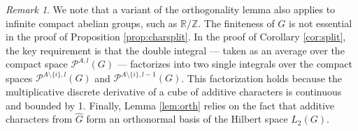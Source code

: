 \documentclass{amsart}
\theoremstyle{definition}
\theoremstyle{remark}
\newtheorem{remark}[theorem]{Remark}
\numberwithin{equation}{section}
\begin{document}
\begin{remark}
We note  that a variant of the orthogonality lemma also applies to infinite compact abelian groups, such as $\mathbb{R}/\mathbb{Z}$. The finiteness of $G$ is not essential in the proof of Proposition \ref{prop:charsplit}. In the proof of Corollary \ref{cor:split}, the key requirement is that the double integral --- taken as an average over the compact space $\mathcal{P}^{A,l}(G)$ --- factorizes into two single integrals over the compact spaces $\mathcal{P}^{A\setminus \{i\},l}(G)$ and 
$\mathcal{P}^{A\setminus \{i\},l-1}(G)$. This factorization holds because the multiplicative discrete derivative of a cube of additive characters is continuous and bounded by 1. Finally, Lemma \ref{lem:orth} relies on the fact that additive characters from $\widehat{G}$ form an orthonormal basis of the Hilbert space $L_2(G)$.
\end{remark}
\end{document}
